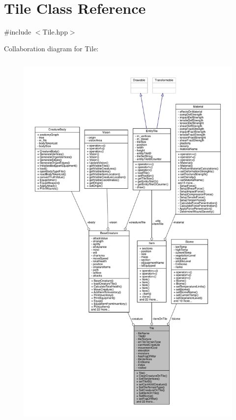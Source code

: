 \hypertarget{class_tile}{}\section{Tile Class Reference}
\label{class_tile}


{\ttfamily \#include $<$Tile.\+hpp$>$}



Collaboration diagram for Tile\+:
\nopagebreak
\begin{figure}[H]
\begin{center}
\leavevmode
\includegraphics[height=550pt]{class_tile__coll__graph}
\end{center}
\end{figure}
